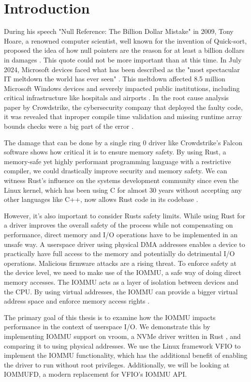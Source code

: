 \chapter{Introduction}\label{c:introduction}

During his speech "Null Reference: The Billion Dollar Mistake" in 2009, Tony Hoare, a renowned computer scientist, well known for the invention of Quick-sort, proposed the idea of how null pointers are the reason for at least a billion dollars in damages \cite{billiondollarmistake}. This quote could not be more important than at this time. In July 2024, Microsoft devices faced what has been described as the "most spectacular IT meltdown the world has ever seen" \cite{bloombergmeltdown}. This meltdown affected 8.5 million Microsoft Windows devices and severely impacted public institutions, including critical infrastructure like hospitals and airports \cite{bloomberg8milliondevices}. In the root cause analysis paper by Crowdstrike, the cybersecurity company that deployed the faulty code, it was revealed that inproper compile time validation and missing runtime array bounds checks were a big part of the error \cite{crowdstrikerca}.

The damage that can be done by a single ring 0 driver like Crowdstrike's Falcon software shows how critical it is to ensure memory safety. By using Rust, a memory-safe yet highly performant programming language with a restrictive compiler, we could drastically improve security and memory safety. We can witness Rust's influence on the systems development community since even the Linux kernel, which has been using C for almost 30 years without accepting any other languages like C++, now allows Rust code in its codebase \cite{linuxrustpull}.

However, it's also important to consider Rusts safety limits. While using Rust for a driver improves the overall safety of the process while not compensating on performance, direct memory and I/O operations have to be implemented in an unsafe way. A userspace driver using physical DMA addresses enables a device to practically have full access to the memory and potentially do detrimental I/O operations. Malicious firmware attacks are a rising threat.
To enforce safety at the device level, we need to make use of the IOMMU, a safe way of doing direct memory accesses. The IOMMU acts as a layer of isolation between devices and the CPU. By using virtual addresses, the IOMMU can provide a bigger virtual address space and enforce memory access rights \cite{OLS2007}.

The primary goal of this thesis is to examine how the IOMMU impacts performance in the context of userspace I/O.
We demonstrate this by implementing IOMMU support on vroom, a NVMe driver written in Rust \cite{vroom}, and comparing it to using physical addresses. We use the Linux framework VFIO to implement the IOMMU functionality, which has the additional benefit of enabling the driver to run without root privileges. Additionally, we will be looking at IOMMUFD, a modern replacement for VFIO's IOMMU API.
